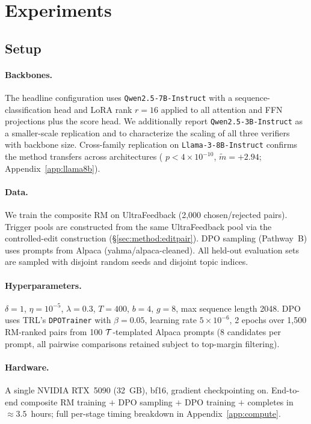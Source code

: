 \section{Experiments}
\label{sec:experiments}

\subsection{Setup}

\paragraph{Backbones.} The headline configuration uses
\texttt{Qwen2.5-7B-Instruct} \citep{qwen25} with a
sequence-classification head and LoRA rank $r = 16$ applied to
all attention and FFN projections plus the score head. We
additionally report \texttt{Qwen2.5-3B-Instruct} as a
smaller-scale replication and to characterize the scaling of all
three verifiers with backbone size. Cross-family replication on
\texttt{Llama-3-8B-Instruct} \citep{llama3} confirms the method
transfers across architectures (\verifya{} $p<4\times 10^{-10}$,
$\tilde{m}{=}+2.94$; Appendix~\ref{app:llama8b}).

\paragraph{Data.} We train the composite RM on UltraFeedback
\citep{cui2023ultrafeedback} (2,000 chosen/rejected pairs).
Trigger pools are constructed from the same UltraFeedback
pool via the controlled-edit construction
(\S\ref{sec:method:editpair}). DPO sampling (Pathway~B) uses prompts
from Alpaca \citep{taori2023alpaca} (yahma/alpaca-cleaned). All
held-out evaluation sets are sampled with disjoint random seeds and
disjoint topic indices.

\paragraph{Hyperparameters.}
$\delta = 1$, $\eta = 10^{-5}$, $\lambda = 0.3$,
$T = 400$, $b = 4$, $g = 8$, max sequence
length 2048. DPO uses TRL's \texttt{DPOTrainer}
\citep{vonwerra2022trl} with $\beta = 0.05$, learning rate
$5\times 10^{-6}$, 2 epochs over 1{,}500 RM-ranked pairs from 100
$\mathcal{T}$-templated Alpaca prompts ($8$ candidates per prompt, all
pairwise comparisons retained subject to top-margin filtering).

\paragraph{Hardware.} A single NVIDIA RTX~5090 (32~GB), bf16,
gradient checkpointing on. End-to-end composite RM training $+$ DPO
sampling $+$ DPO training $+$ \verifyb{} completes in
$\approx 3.5$~hours; full per-stage timing breakdown in
Appendix~\ref{app:compute}.

